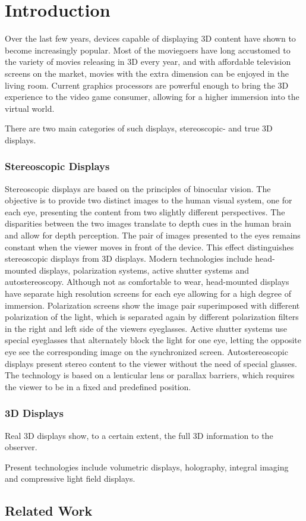 \chapter{Introduction}
\label{chp:introduction}

Over the last few years, devices capable of displaying 3D content have shown to become increasingly popular.
Most of the moviegoers have long accustomed to the variety of movies releasing in 3D every year, and with affordable television screens on the market, movies with the extra dimension can be enjoyed in the living room.
Current graphics processors are powerful enough to bring the 3D experience to the video game consumer, allowing for a higher immersion into the virtual world.

There are two main categories of such displays, stereoscopic- and true 3D displays.

\subsection*{Stereoscopic Displays}

Stereoscopic displays are based on the principles of binocular vision.
The objective is to provide two distinct images to the human visual system, one for each eye, presenting the content from two slightly different perspectives.
The disparities between the two images translate to depth cues in the human brain and allow for depth perception.
The pair of images presented to the eyes remains constant when the viewer moves in front of the device. 
This effect distinguishes stereoscopic displays from 3D displays.
Modern technologies include head-mounted displays, polarization systems, active shutter systems and autostereoscopy.
Although not as comfortable to wear, head-mounted displays have separate high resolution screens for each eye allowing for a high degree of immersion.
Polarization screens show the image pair superimposed with different polarization of the light, which is separated again by different polarization filters in the right and left side of the viewers eyeglasses.
Active shutter systems use special eyeglasses that alternately block the light for one eye, letting the opposite eye see the corresponding image on the synchronized screen.
Autostereoscopic displays present stereo content to the viewer without the need of special glasses. 
The technology is based on a lenticular lens or parallax barriers, which requires the viewer to be in a fixed and predefined position. 

\subsection*{3D Displays}

Real 3D displays show, to a certain extent, the full 3D information to the observer.

Present technologies include volumetric displays, holography, integral imaging and compressive light field displays.

\section{Related Work}
